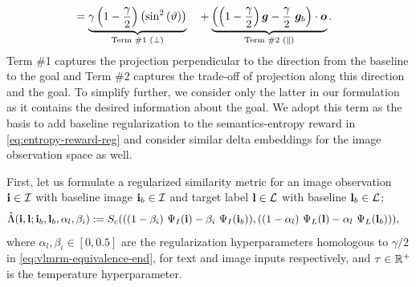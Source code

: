\begin{align}
    &= \underbrace{\gamma\left(1 - \dfrac{\gamma}{2}\right)\left(\sin^2\left(\vartheta\right)\right)}_{\text{Term \#1 (\(\perp\))}} &&+ \underbrace{\left(\left(1 - \dfrac{\gamma}{2}\right) \bm{g} - \dfrac{\gamma}{2}\ \bm{g}_b\right) \cdot \bm{o}}_{\text{Term \#2 (\(\parallel\))}}.
    \label{eq:vlmrm-equivalence-end}
\end{align}
Term \#1 captures the projection perpendicular to the direction from the baseline to the goal and Term \#2 captures the trade-off of projection along this direction and the goal.
To simplify further, we consider only the latter in our formulation as it contains the desired information about the goal.
We adopt this term as the basis to add baseline regularization to the semantics-entropy reward in \eqref{eq:entropy-reward-reg} and consider similar delta embeddings for the image observation space as well.

First, let us formulate a regularized similarity metric for an image observation \(\mathbf{i} \in \mathcal{I}\) with baseline image \(\mathbf{i}_b \in \mathcal{I}\) and target label \(\mathbf{l} \in \mathcal{L}\) with baseline \(\mathbf{l}_b \in \mathcal{L}\);
\begin{equation}
    \label{eq:clip-similarity-reg}
    \begin{split}
        \hat{\Lambda}(\mathbf{i}, \mathbf{l}; \mathbf{i}_b, \mathbf{l}_b, \alpha_{l}, \beta_{i})
        &:= S_c(
            ((1 - \beta_{i})\ \Psi_I(\mathbf{i}) - \beta_{i}\ \Psi_I(\mathbf{i}_b)),
            ((1 - \alpha_{l})\ \Psi_L(\mathbf{l}) - \alpha_{l}\ \Psi_L(\mathbf{l}_b))
        ),
    \end{split}
\end{equation}
where \(\alpha_{l}, \beta_{i} \in [0, 0.5]\) are the regularization hyperparameters homologous to \(\gamma / 2\) in \eqref{eq:vlmrm-equivalence-end}, for text and image inputs respectively, and \(\tau \in \mathbb{R}^+\) is the temperature hyperparameter.

